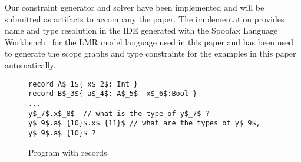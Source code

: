 
\noindent Our constraint generator and solver have been implemented and will be
submitted as artifacts to accompany the paper. The implementation provides name
and type resolution in the IDE generated with the Spoofax Language
Workbench~\cite{KatsV10} for the LMR model language used in this paper and has
been used to generate the scope graphs and type constraints for the examples in
this paper automatically.

\begin{figure}[t]
\begin{lstlisting}[language=LMR,basicstyle=\lstfigurestyle,breaklines=true]
record A$_1${ x$_2$: Int }
record B$_3${ a$_4$: A$_5$  x$_6$:Bool }
...
y$_7$.x$_8$  // what is the type of y$_7$ ? 
y$_9$.a$_{10}$.x$_{11}$ // what are the types of y$_9$, y$_9$.a$_{10}$ ?
\end{lstlisting}
\caption{Program with records}
\label{fig:records-program} 
\end{figure}


\endinput

As an example, consider the program in Figure~\ref{fig:simple-prog}
in an expression-oriented language with standard lexical scoping rules.
\begin{figure}
\begin{lstlisting}[language=LMR,basicstyle=\lstfigurestyle,breaklines=true]
fun y$_1$:Int { 
  fun y$_2$:Bool { 
    let x$_3$:Bool = if y$_4$ then True else y$_5$ 
    in x$_6$
  }
}
\end{lstlisting}
\label{fig:simple-prog}
\caption{A simple program}
\end{figure}
Subscripts on identifiers
represent AST positions. From the scope graph for this program,
the resolution algorithm will generate the facts
\[
\ri{\cod{y}}{4}  \resolve  \di{\cod{y}}{2},
\ri{\cod{y}}{5}  \resolve  \di{\cod{y}}{2},
\ri{\cod{x}}{6}  \resolve  \di{\cod{x}}{3}
\]
Note that resolution takes account of the shadowing of the binding
at \cod{y}$_1$ by the binding at \cod{y}$_2$; this is the whole point
of the resolution calculus.

Scope graphs do not 
include explicit type information. However, if the language associates
types with identifier declarations, it is easy to obtain the type of
an identifier reference by first resolving the reference to a declaration
and then looking up the associated type information by position in the AST.\footnote{
There is nothing special about types in this regard: the same
mechanism can be used to obtain other declaration attributes such as 
record field offsets, visibility attributes, etc.} 
For example, the program of Figure~\ref{fig:simple-prog} carries this
associated type information:
\[
\typeat{1}  =  \mbox{\tt Int},
\typeat{2}  =  \mbox{\tt Bool},
\typeat{3}  =  \mbox{\tt Bool}
\]
This lookup facility 
can be made available as a service to a separate type resolution mechanism.

